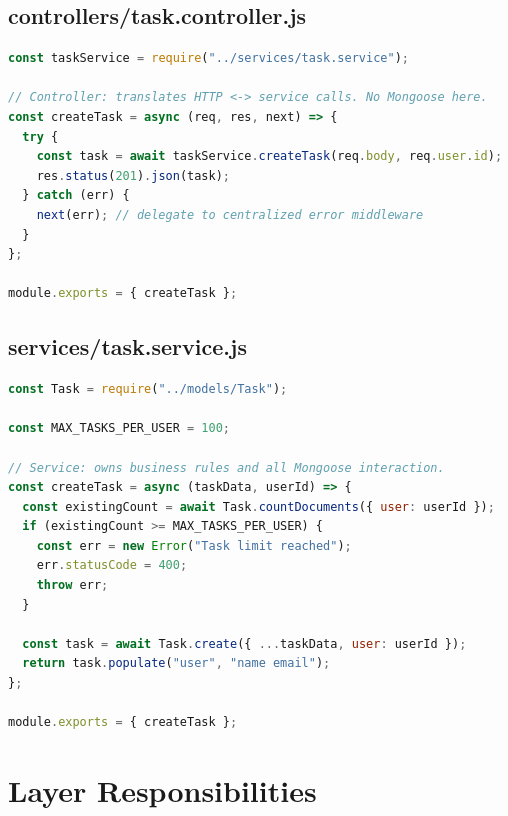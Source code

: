 \subsection{controllers/task.controller.js}

\begin{lstlisting}[language=JavaScript]
const taskService = require("../services/task.service");

// Controller: translates HTTP <-> service calls. No Mongoose here.
const createTask = async (req, res, next) => {
  try {
    const task = await taskService.createTask(req.body, req.user.id);
    res.status(201).json(task);
  } catch (err) {
    next(err); // delegate to centralized error middleware
  }
};

module.exports = { createTask };
\end{lstlisting}

\subsection{services/task.service.js}

\begin{lstlisting}[language=JavaScript]
const Task = require("../models/Task");

const MAX_TASKS_PER_USER = 100;

// Service: owns business rules and all Mongoose interaction.
const createTask = async (taskData, userId) => {
  const existingCount = await Task.countDocuments({ user: userId });
  if (existingCount >= MAX_TASKS_PER_USER) {
    const err = new Error("Task limit reached");
    err.statusCode = 400;
    throw err;
  }

  const task = await Task.create({ ...taskData, user: userId });
  return task.populate("user", "name email");
};

module.exports = { createTask };
\end{lstlisting}

\section{Layer Responsibilities}

